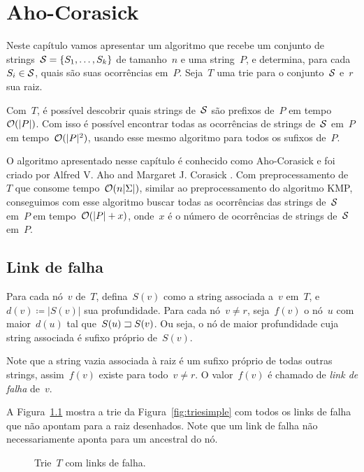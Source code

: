 \chapter{Aho-Corasick} \label{chap:aho}

Neste capítulo vamos apresentar um algoritmo que recebe um conjunto de strings~${\mathcal{S} = \{S_1, \ldots, S_k\}}$ de tamanho~$n$ e uma string~$P$, e determina, para cada~$S_i \in \mathcal{S}$, quais são suas ocorrências em~$P$.
Seja~$T$ uma trie para o conjunto~$\mathcal{S}$ e~$r$ sua raiz.

Com~$T$, é possível descobrir quais strings de~$\mathcal{S}$ são prefixos de~$P$ em tempo~$\mathcal{O}(|P|)$. Com isso é possível encontrar todas as ocorrências de strings de~$\mathcal{S}$ em~$P$ em tempo~$\mathcal{O}(|P|^2)$, usando esse mesmo algoritmo para todos os sufixos de~$P$.

O algoritmo apresentado nesse capítulo é conhecido como Aho-Corasick e foi criado por Alfred V. Aho and Margaret J. Corasick \cite{aho}. Com preprocessamento de~$T$ que consome tempo~$\mathcal{O}(n|\Sigma|)$, similar ao preprocessamento do algoritmo KMP, conseguimos com esse algoritmo buscar todas as ocorrências das strings de~$\mathcal{S}$ em~$P$ em tempo~$\mathcal{O}(|P| + x)$, onde~$x$ é o número de ocorrências de strings de~$\mathcal{S}$ em~$P$.

\section{Link de falha}

Para cada nó~$v$ de~$T$, defina~$S(v)$ como a string associada a~$v$ em~$T$, e~$d(v) \coloneqq |S(v)|$ sua profundidade. Para cada nó~$v \neq r$, seja~$f(v)$ o nó~$u$ com maior~$d(u)$ tal que~$S(u) \sqsupset S(v)$. Ou seja, o nó de maior profundidade cuja string associada é sufixo próprio de~$S(v)$.

Note que a string vazia associada à raiz é um sufixo próprio de todas outras strings, assim~$f(v)$ existe para todo~$v \neq r$. O valor~$f(v)$ é chamado de \emph{link de falha} de~$v$.

A Figura~\ref{fig:triefail} mostra a trie da Figura~\ref{fig:triesimple} com todos os links de falha que não apontam para a raiz desenhados. Note que um link de falha não necessariamente aponta para um ancestral do nó.

\begin{figure}
\centering
{}
\caption{Trie~$T$ com links de falha.} \label{fig:triefail}
\end{figure}


